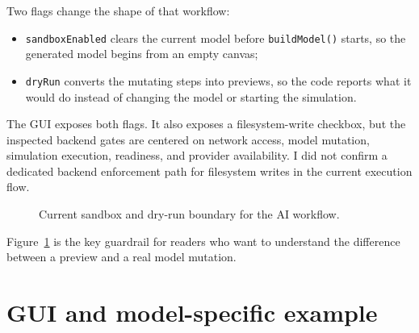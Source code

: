 Two flags change the shape of that workflow:
\begin{itemize}
\item \texttt{sandboxEnabled} clears the current model before \texttt{buildModel()} starts, so the generated model begins from an empty canvas;
\item \texttt{dryRun} converts the mutating steps into previews, so the code reports what it would do instead of changing the model or starting the simulation.
\end{itemize}

The GUI exposes both flags. It also exposes a filesystem-write checkbox, but the inspected backend gates are centered on network access, model mutation, simulation execution, readiness, and provider availability. I did not confirm a dedicated backend enforcement path for filesystem writes in the current execution flow.

\begin{figure}[htbp]
\centering
\caption{Current sandbox and dry-run boundary for the AI workflow.}
\label{fig:ai-sandbox-boundary}
\end{figure}

Figure~\ref{fig:ai-sandbox-boundary} is the key guardrail for readers who want to understand the difference between a preview and a real model mutation.

\section{GUI and model-specific example}
\label{sec:ai-gui-model-specific}

